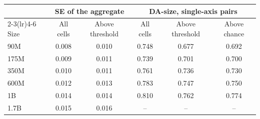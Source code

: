 \begin{tabular}{lccccc}
\toprule
 & \multicolumn{2}{c}{SE of the aggregate} & \multicolumn{3}{c}{DA-size, single-axis pairs} \\
\cmidrule(lr){2-3}\cmidrule(lr){4-6}
Size & All cells & Above threshold & All cells & Above threshold & Above chance \\
\midrule
90M & 0.008 & 0.010 & 0.748 & 0.677 & 0.692 \\
175M & 0.009 & 0.011 & 0.739 & 0.701 & 0.700 \\
350M & 0.010 & 0.011 & 0.761 & 0.736 & 0.730 \\
600M & 0.012 & 0.013 & 0.783 & 0.747 & 0.750 \\
1B & 0.014 & 0.014 & 0.810 & 0.762 & 0.774 \\
1.7B & 0.015 & 0.016 & -- & -- & -- \\
\bottomrule
\end{tabular}
